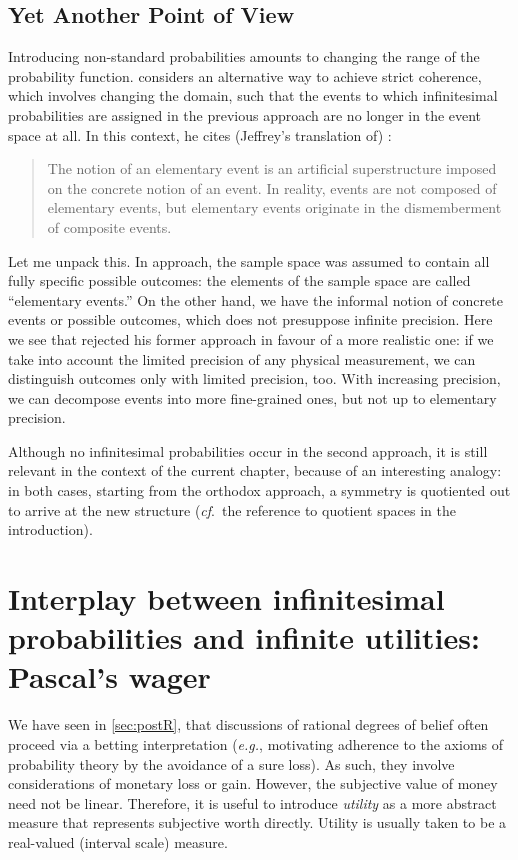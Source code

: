 \subsection{Yet Another Point of View}
Introducing non-standard probabilities amounts to changing the range of the probability function. \citet{Skyrms:1995} considers an alternative way to achieve strict coherence, which involves changing the domain, such that the events to which infinitesimal probabilities are assigned in the previous approach are no longer in the event space at all.
In this context, he cites (Jeffrey's translation of) \citet{Kolmogorov:1948}:
\begin{quote}
The notion of an elementary event is an artificial superstructure imposed on the concrete notion of an event. In reality, events are not composed of elementary events, but elementary events originate in the dismemberment of composite events.
\end{quote}
Let me unpack this. In  approach, the sample space was assumed to contain all fully specific possible outcomes: the elements of the sample space are called ``elementary events.'' On the other hand, we have the informal notion of concrete events or possible outcomes, which does not presuppose infinite precision. Here we see that \citet{Kolmogorov:1948} rejected his former approach in favour of a more realistic one: if we take into account the limited precision of any physical measurement, we can distinguish outcomes only with limited precision, too. With increasing precision, we can decompose events into more fine-grained ones, but not up to elementary precision.

Although no infinitesimal probabilities occur in the second approach, it is still relevant in the context of the current chapter, because of an interesting analogy: in both cases, starting from the orthodox approach, a symmetry is quotiented out to arrive at the new structure (\textit{cf}.\ the reference to quotient spaces in the introduction).

\section[Infinitesimal Probability and Infinite Utility]{Interplay between infinitesimal probabilities and infinite utilities: Pascal's wager}\label{sec:pascalswager}


We have seen in \autoref{sec:postR}, that discussions of rational degrees of belief often proceed via a betting interpretation (\textit{e.g.}, motivating adherence to the axioms of probability theory by the avoidance of a sure loss). As such, they involve considerations of monetary loss or gain. However, the subjective value of money need not be linear. Therefore, it is useful to introduce \textit{utility} as a more abstract measure that represents subjective worth directly. Utility is usually taken to be a real-valued (interval scale) measure.

